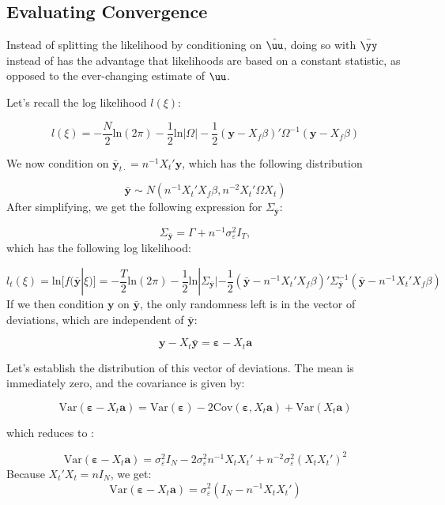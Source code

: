 \subsection{Evaluating Convergence}


Instead of splitting the likelihood by conditioning on $\hat{\uu}$, doing so with $\bar{\yy}$ instead of has the advantage that likelihoods are based on a constant statistic, as opposed to the ever-changing estimate of $\uu$.

Let's recall the log likelihood $l(\xi)$:

$$ l(\xi) = -\frac{N}{2}\text{ln}(2\pi) - \frac{1}{2}\text{ln}|\Omega| - \frac{1}{2}(\mathbf{y}-X_f\beta)'\Omega^{-1}(\mathbf{y} - X_f\beta) $$

We now condition on $\bar{\mathbf{y}}_{t\cdot} = n^{-1}X_t'\mathbf{y}$, which has the following distribution

$$\bar{\mathbf{y}} \sim N(n^{-1}X_t'X_f\beta, n^{-2}X_t'\Omega X_t) $$
After simplifying, we get the following expression for $\Sigma_{\bar{\mathbf{y}}}$:

$$ \Sigma_{\bar{\mathbf{y}}} = \Gamma + n^{-1}\sigma_\varepsilon^2I_T, $$
which has the following log likelihood:

$$ l_t(\xi) = \text{ln}[f(\bar{\mathbf{y}}|\xi)] = -\frac{T}{2}\text{ln}(2\pi) - \frac{1}{2}\text{ln}|\Sigma_{\bar{\mathbf{y}}}| - \frac{1}{2}(\bar{\mathbf{y}} - n^{-1}X_t'X_f\beta)'\Sigma_{\bar{\mathbf{y}}}^{-1}(\bar{\mathbf{y}} - n^{-1}X_t'X_f\beta) $$
If we then condition $\mathbf{y}$ on $\bar{\mathbf{y}}$, the only randomness left is in the vector of deviations, which are independent of $\bar{\mathbf{y}}$:

$$ \mathbf{y} - X_t\bar{\mathbf{y}} = \bm{\varepsilon} - X_t\mathbf{a}   $$

Let's establish the distribution of this vector of deviations. The mean is immediately zero, and the covariance is given by:

$$ \text{Var}(\bm{\varepsilon} - X_t\mathbf{a}) = \text{Var}(\bm{\varepsilon})  - 2 \text{Cov}(\bm{\varepsilon},X_t\mathbf{a}) + \text{Var}(X_t\mathbf{a})  $$

which reduces to :

$$ \text{Var}(\bm{\varepsilon} - X_t\mathbf{a}) = \sigma_\varepsilon^2I_N  - 2 \sigma_\varepsilon^2 n^{-1}X_tX_t' + n^{-2}\sigma_\varepsilon^2(X_tX_t')^2  $$
Because $X_t'X_t = nI_N$, we get:
\begin{equation}
    \text{Var}(\bm{\varepsilon} - X_t\mathbf{a}) = \sigma_\varepsilon^2(I_N  -  n^{-1}X_tX_t') 
    \label{eq:var_dev}
\end{equation}


